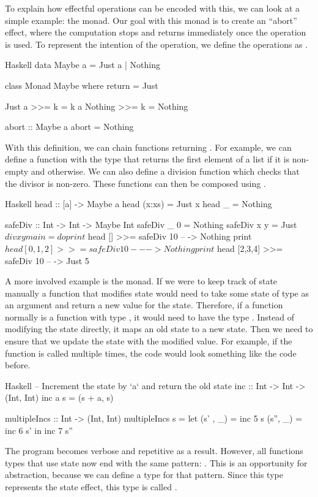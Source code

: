 To explain how effectful operations can be encoded with this, we can look at a simple example: the  monad. Our goal with this monad is to create an ``abort'' effect, where the computation stops and returns immediately once the  operation is used. To represent the intention of the operation, we define the  operations as .

\begin{lst}{Haskell}
data Maybe a
  = Just a
  | Nothing

class Monad Maybe where
  return = Just
  
  Just a  >>= k = k a
  Nothing >>= k = Nothing

abort :: Maybe a
abort = Nothing
\end{lst}
%
With this definition, we can chain functions returning . For example, we can define a  function with the type  that returns the first element of a list if it is non-empty and  otherwise. We can also define a division function which checks that the divisor is non-zero. These functions can then be composed using \hs{>>=}.

\begin{lst}{Haskell}
head :: [a] -> Maybe a
head (x:xs) = Just x
head _ = Nothing

safeDiv :: Int -> Int -> Maybe Int
safeDiv _ 0 = Nothing
safeDiv x y = Just $ div x y

main = do
  print $ head []      >>= safeDiv 10 -- -> Nothing
  print $ head [0,1,2] >>= safeDiv 10 -- -> Nothing
  print $ head [2,3,4] >>= safeDiv 10 -- -> Just 5
\end{lst}
%
A more involved example is the  monad. If we were to keep track of state manually a function that modifies state would need to take some state of type  as an argument and return a new value for the state. Therefore, if a function  normally is a function with type , it would need to have the type . Instead of modifying the state directly, it maps an old state to a new state. Then we need to ensure that we update the state with the modified value. For example, if the function is called multiple times, the code would look something like the code before.

\begin{lst}{Haskell}
-- Increment the state by `a` and return the old state
inc :: Int -> Int -> (Int, Int)
inc a s = (s + a, s)

multipleIncs :: Int -> (Int, Int)
multipleIncs s = let
  (s' , _) = inc 5 s
  (s'', _) = inc 6 s'
  in inc 7 s''
\end{lst}
%
The program becomes verbose and repetitive as a result. However, all functions types that use state now end with the same pattern: . This is an opportunity for abstraction, because we can define a type for that pattern. Since this type represents the state effect, this type is called .

